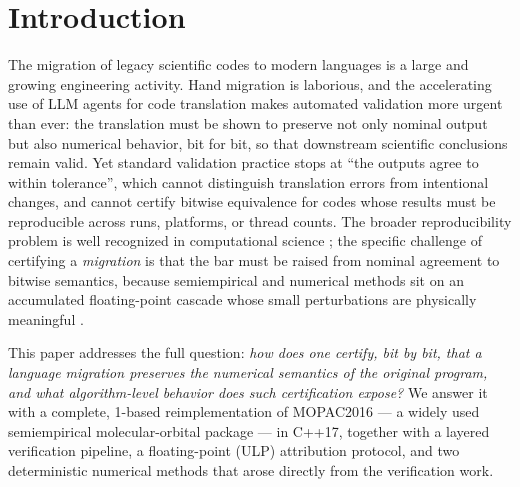\documentclass[preprint,12pt]{elsarticle}
\begin{document}
\section{Introduction}\label{sec:intro}

The migration of legacy scientific codes to modern languages is a large and growing engineering activity. Hand migration is laborious, and the accelerating use of LLM agents for code translation \cite{chen2021} makes automated validation more urgent than ever: the translation must be shown to preserve not only nominal output but also numerical behavior, bit for bit, so that downstream scientific conclusions remain valid. Yet standard validation practice stops at ``the outputs agree to within tolerance'', which cannot distinguish translation errors from intentional changes, and cannot certify bitwise equivalence for codes whose results must be reproducible across runs, platforms, or thread counts. The broader reproducibility problem is well recognized in computational science \cite{peng2011,sandve2013,stodden2010,donoho2010}; the specific challenge of certifying a \emph{migration} is that the bar must be raised from nominal agreement to bitwise semantics, because semiempirical and numerical methods sit on an accumulated floating-point cascade whose small perturbations are physically meaningful \cite{thiel2014,goldberg1991}.

This paper addresses the full question: \emph{how does one certify, bit by bit, that a language migration preserves the numerical semantics of the original program, and what algorithm-level behavior does such certification expose?} We answer it with a complete, 1-based reimplementation of MOPAC2016 \cite{moussa2026} --- a widely used semiempirical molecular-orbital package \cite{thiel2014} --- in C++17, together with a layered verification pipeline, a floating-point (ULP) attribution protocol, and two deterministic numerical methods that arose directly from the verification work.
\end{document}
